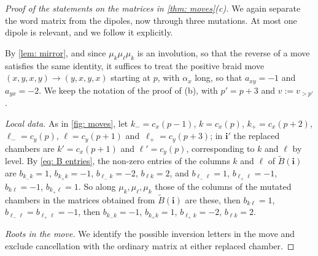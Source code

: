 \documentclass[a4paper]{amsart}
\numberwithin{equation}{section}
\theoremstyle{definition}
\theoremstyle{remark}
\newcommand{\bfi}{\mathbf{i}}
\newcommand{\tB}{\widetilde{B}}
\begin{document}
\begin{proof}[Proof of the statements on the matrices in \cref{thm: moves}(c)]
  We again separate the word matrix from the dipoles, now through three mutations.
  At most one dipole is relevant, and we follow it explicitly.

  By \cref{lem: mirror}, and since $\mu_k\mu_\ell\mu_k$ is an involution, so that the reverse of a move satisfies the same identity, it suffices to treat the positive braid move $(x,y,x,y)\to(y,x,y,x)$ starting at $p$, with $\alpha_x$ long, so that $a_{xy}=-1$ and $a_{yx}=-2$.
  We keep the notation of the proof of (b), with $p'=p+3$ and $v:=v_{>p'}$.

  \emph{Local data.} As in \cref{fig: moves}, let $k_-=c_x(p-1)$, $k=c_x(p)$, $k_+=c_x(p+2)$, $\ell_-=c_y(p)$, $\ell=c_y(p+1)$ and~$\ell_+=c_y(p+3)$; in $\bfi'$ the replaced chambers are $k'=c_x(p+1)$ and $\ell'=c_y(p)$, corresponding to $k$ and $\ell$ by level.
  By \eqref{eq: B entries}, the non-zero entries of the columns $k$ and $\ell$ of $\tB(\bfi)$ are $b_{k_-k}=1$, $b_{k_+k}=-1$, $b_{\ell_-k}=-2$, $b_{\ell k}=2$, and $b_{\ell_-\ell}=1$, $b_{\ell_+\ell}=-1$, $b_{k\ell}=-1$, $b_{k_+\ell}=1$.
  So along $\mu_k,\mu_\ell,\mu_k$ those of the columns of the mutated chambers in the matrices obtained from $\tB(\bfi)$ are these, then $b_{k\ell}=1$, $b_{\ell_-\ell}=b_{\ell_+\ell}=-1$, then $b_{k_-k}=-1$, $b_{k_+k}=1$, $b_{\ell_+k}=-2$, $b_{\ell k}=2$.

  \emph{Roots in the move.} We identify the possible inversion letters in the move and exclude cancellation with the ordinary matrix at either replaced chamber.


\end{proof}
\end{document}
